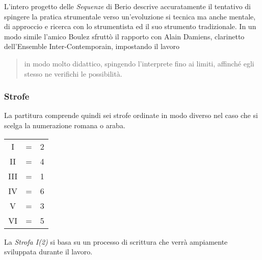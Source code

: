 L'intero progetto delle \emph{Sequenze} di Berio descrive accuratamente il tentativo di spingere la pratica strumentale verso un'evoluzione si tecnica ma anche mentale, di approccio e ricerca con lo strumentista ed il suo strumento tradizionale. In un modo simile l'amico Boulez sfruttò il rapporto con Alain Damiens, clarinetto dell'Ensemble Inter-Contemporain, impostando il lavoro

\begin{quote}
{\small
in modo molto didattico, spingendo l'interprete fino ai limiti, affinché egli stesso ne verifichi le possibilità.
}
\end{quote}


\subsubsection*{Strofe}

La partitura comprende quindi sei strofe ordinate in modo diverso nel caso che si scelga la numerazione romana o araba.

\begin{minipage}[t]{0.89\columnwidth}%

\begin{table}[H]
\begin{tabular}{c c c}

I 	& = & 2 \\
II	& = & 4 \\
III	& = & 1 \\
IV	& = & 6 \\
V	& = & 3 \\
VI	& = & 5 \\

\end{tabular}
\end{table}%

\end{minipage}%
\bigskip

La \emph{Strofa I(2)} si basa su un processo di scrittura che verrà ampiamente sviluppata durante il lavoro. %

